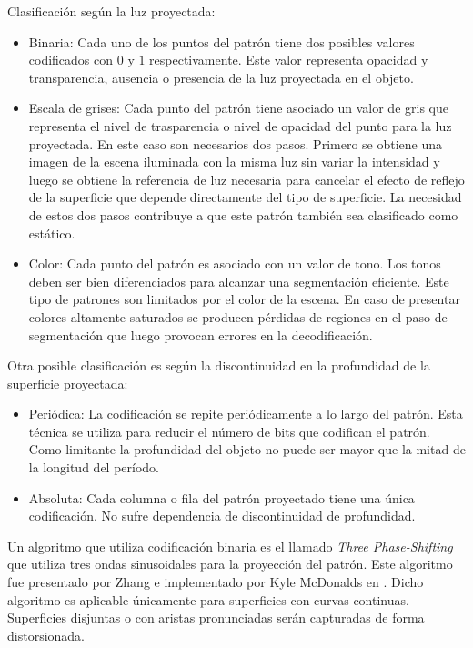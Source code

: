 Clasificación según la luz proyectada:
\begin{itemize}
	\item Binaria: Cada uno de los puntos del patrón tiene dos posibles valores codificados con $0$ y $1$ respectivamente. Este valor representa opacidad y transparencia, ausencia o presencia de la luz proyectada en el objeto.
	\item Escala de grises: Cada punto del patrón tiene asociado un valor de gris que representa el nivel de trasparencia o nivel de opacidad del punto para la luz proyectada. En este caso son necesarios dos pasos. Primero se obtiene una imagen de la escena iluminada con la misma luz sin variar la intensidad y luego se obtiene la referencia de luz necesaria para cancelar el efecto de reflejo de la superficie que depende directamente del tipo de superficie. La necesidad de estos dos pasos contribuye a que este patrón también sea clasificado como estático.
	\item Color: Cada punto del patrón es asociado con un valor de tono. Los tonos deben ser bien diferenciados para alcanzar una segmentación eficiente. Este tipo de patrones son limitados por el color de la escena. En caso de presentar colores altamente saturados se producen pérdidas de regiones en el paso de segmentación que luego provocan errores en la decodificación.
\end{itemize}

Otra posible clasificación es según la discontinuidad en la profundidad de la superficie proyectada:
\begin{itemize}
	\item Periódica: La codificación se repite periódicamente a lo largo del patrón. Esta técnica se utiliza para reducir el número de bits que codifican el patrón. Como limitante la profundidad del objeto no puede ser mayor que la mitad de la longitud del período.
	\item Absoluta: Cada columna o fila del patrón proyectado tiene una única codificación. No sufre dependencia de discontinuidad de profundidad.
\end{itemize}

Un algoritmo que utiliza codificación binaria es el llamado \emph{Three Phase-Shifting} que utiliza tres ondas sinusoidales para la proyección del patrón. Este algoritmo fue presentado por Zhang\cite{ZhangS} e implementado por Kyle McDonalds en \cite{KyleMcDonald}. Dicho algoritmo es aplicable únicamente para superficies con curvas continuas. Superficies disjuntas o con aristas pronunciadas serán capturadas de forma distorsionada.

